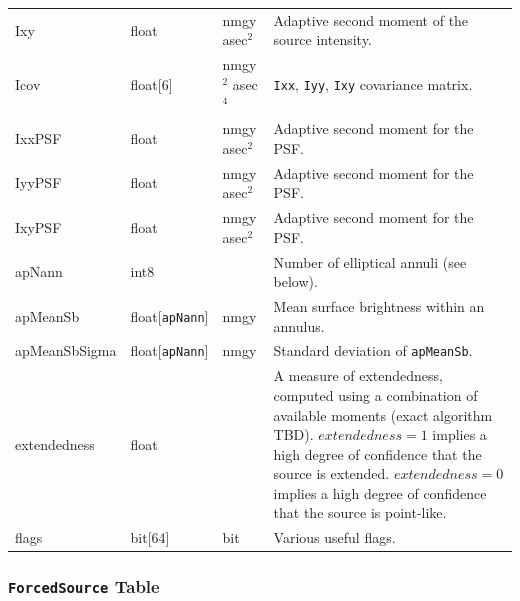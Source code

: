 \documentclass[12pt]{article}
\newcommand{\code}[1]{\texttt{#1}}
\newcommand{\ForcedSource}{\code{ForcedSource}\xspace}
\newcommand{\req}[1]{\marginpar{\tiny #1}}
\newcommand{\dmreq}[1]{\req{DMS-REQ-#1}}
\begin{document}
\begin{center}
\begin{longtable}{p{3cm}p{2cm}p{2cm}p{5cm}}
Ixy & float & nmgy asec$^{2}$ & Adaptive second moment of the source intensity. \\

Icov & float[6] & nmgy$^{2}$ asec$^{4}$ & {\tt Ixx}, {\tt Iyy}, {\tt Ixy} covariance matrix. \\

IxxPSF & float & nmgy asec$^{2}$ & Adaptive second moment for the PSF. \\

IyyPSF & float & nmgy asec$^{2}$ & Adaptive second moment for the PSF. \\

IxyPSF & float & nmgy asec$^{2}$ & Adaptive second moment for the PSF. \\

apNann & int8 & ~ & Number of elliptical annuli (see below). \\

apMeanSb & float[{\tt apNann}] & nmgy & Mean surface brightness within an annulus. \\

apMeanSbSigma & float[{\tt apNann}] & nmgy & Standard deviation of {\tt apMeanSb}. \\

extendedness & float & ~ & A measure of extendedness, computed using a combination of available moments
(exact algorithm TBD). $extendedness=1$ implies a high degree of confidence that the source is extended. $extendedness=0$ implies a high degree of confidence that the source is point-like. \\

flags & bit[64] & bit & Various useful flags. \\ \hline
\end{longtable}
\end{center}





\subsubsection{\ForcedSource Table}
\label{sec:forcedSourceTable}
\dmreq{0268}
\end{document}
